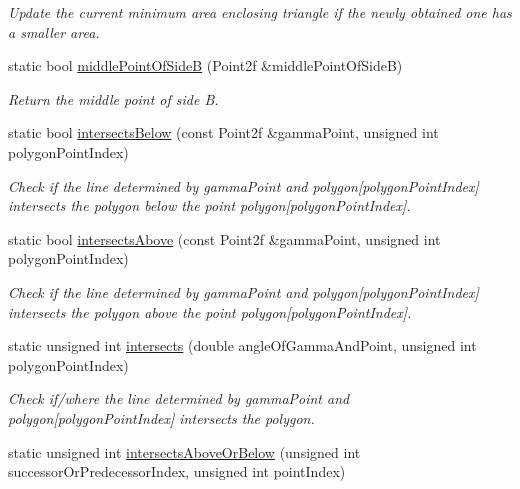 \begin{DoxyCompactItemize}
\begin{DoxyCompactList}\small\item\em Update the current minimum area enclosing triangle if the newly obtained one has a smaller area. \end{DoxyCompactList}\item 
static bool \hyperlink{classmultiscale_1_1MinimumAreaEnclosingTriangle_aedcbb3708672759e60a547d0a5eb0ddd}{middle\-Point\-Of\-Side\-B} (Point2f \&middle\-Point\-Of\-Side\-B)
\begin{DoxyCompactList}\small\item\em Return the middle point of side B. \end{DoxyCompactList}\item 
static bool \hyperlink{classmultiscale_1_1MinimumAreaEnclosingTriangle_a9f68018fd829d176bb6de00c8e5d2291}{intersects\-Below} (const Point2f \&gamma\-Point, unsigned int polygon\-Point\-Index)
\begin{DoxyCompactList}\small\item\em Check if the line determined by gamma\-Point and polygon\mbox{[}polygon\-Point\-Index\mbox{]} intersects the polygon below the point polygon\mbox{[}polygon\-Point\-Index\mbox{]}. \end{DoxyCompactList}\item 
static bool \hyperlink{classmultiscale_1_1MinimumAreaEnclosingTriangle_a4d0a39f0a938817b6b07985f6f85da9c}{intersects\-Above} (const Point2f \&gamma\-Point, unsigned int polygon\-Point\-Index)
\begin{DoxyCompactList}\small\item\em Check if the line determined by gamma\-Point and polygon\mbox{[}polygon\-Point\-Index\mbox{]} intersects the polygon above the point polygon\mbox{[}polygon\-Point\-Index\mbox{]}. \end{DoxyCompactList}\item 
static unsigned int \hyperlink{classmultiscale_1_1MinimumAreaEnclosingTriangle_a30883d4893c5775e1e59da3ecde12930}{intersects} (double angle\-Of\-Gamma\-And\-Point, unsigned int polygon\-Point\-Index)
\begin{DoxyCompactList}\small\item\em Check if/where the line determined by gamma\-Point and polygon\mbox{[}polygon\-Point\-Index\mbox{]} intersects the polygon. \end{DoxyCompactList}\item 
static unsigned int \hyperlink{classmultiscale_1_1MinimumAreaEnclosingTriangle_a9bfe25a1a27190784fe106bb6d51e0de}{intersects\-Above\-Or\-Below} (unsigned int successor\-Or\-Predecessor\-Index, unsigned int point\-Index)

\end{DoxyCompactItemize}
